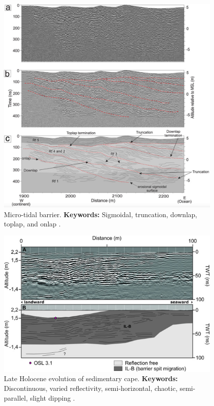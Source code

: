 \begin{figure}[h!]
    \centering
    \includegraphics[width=0.9\linewidth]{Figures/0.2GPR/Santos2022_3.png}
    \caption[Micro-tidal barrier.]{Micro-tidal barrier. \textbf{Keywords: } Sigmoidal, truncation, downlap, toplap, and onlap \citep{Santos2022}.}
    \label{fig:Santos2022-3}
\end{figure}

\begin{landscape}
\begin{figure}[h!]
    \centering
    \includegraphics[width=0.9\linewidth]{Figures/0.2GPR/Figueiredo2021-gr8.jpg}
    \caption[Late Holocene evolution of sedimentary cape.]{Late Holocene evolution of sedimentary cape. \textbf{Keywords: } Discontinuous, varied reflectivity, semi-horizontal, chaotic, semi-parallel, slight dipping \citep{Figueiredo2021}.}
    \label{fig:Figueiredo2021-8}
\end{figure}
\end{landscape}
\clearpage

